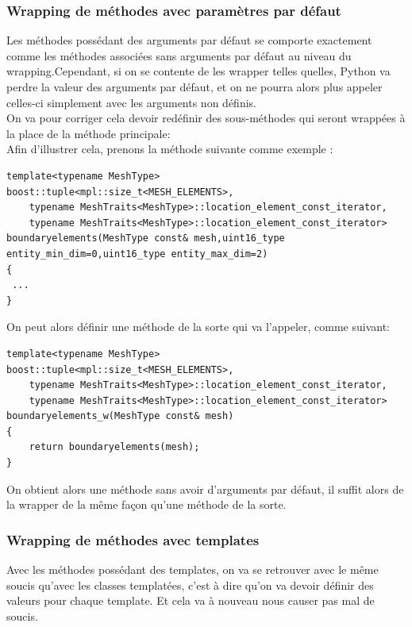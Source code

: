 \documentclass[french,12pt]{article}
\begin{document}
\subsubsection{Wrapping de méthodes avec paramètres par défaut}

Les méthodes possédant des arguments par défaut se comporte exactement comme les méthodes associées sans arguments par défaut au niveau du wrapping.Cependant, si on se contente de les wrapper telles quelles, Python va perdre la valeur des arguments par défaut, et on ne pourra alors plus appeler celles-ci simplement avec les arguments non définis.\\
On va pour corriger cela devoir redéfinir des sous-méthodes qui seront wrappées à la place de la méthode principale: \\
Afin d’illustrer cela, prenons la méthode suivante comme exemple :

\newpage
\begin{lstlisting}
template<typename MeshType>
boost::tuple<mpl::size_t<MESH_ELEMENTS>,
	typename MeshTraits<MeshType>::location_element_const_iterator,
	typename MeshTraits<MeshType>::location_element_const_iterator>
boundaryelements(MeshType const& mesh,uint16_type entity_min_dim=0,uint16_type entity_max_dim=2)
{
 ...
}
\end{lstlisting}

On peut alors définir une méthode de la sorte qui va l'appeler, comme suivant:
\begin{lstlisting}
template<typename MeshType>
boost::tuple<mpl::size_t<MESH_ELEMENTS>,
	typename MeshTraits<MeshType>::location_element_const_iterator,
	typename MeshTraits<MeshType>::location_element_const_iterator>
boundaryelements_w(MeshType const& mesh)
{
 	return boundaryelements(mesh);
}
\end{lstlisting}

On obtient alors une méthode sans avoir d'arguments par défaut, il suffit alors de la wrapper de la même façon qu'une méthode de la sorte.

\subsubsection{Wrapping de méthodes avec templates}

Avec les méthodes possédant des templates, on va se retrouver avec le même soucis qu'avec les classes templatées, c'est à dire qu'on va devoir définir des valeurs pour chaque template. Et cela va à nouveau nous causer pas mal de soucis.\\
\end{document}
